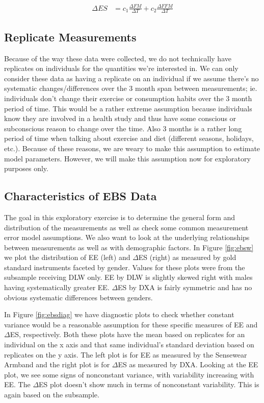 \documentclass[11pt]{article}\usepackage[]{graphicx}\usepackage[]{color}
\begin{document}
\begin{align}
  \label{escalc}
  \Delta ES &= c_1 \frac{\Delta FM}{\Delta T} + c_2 \frac{\Delta FFM}{\Delta T}
\end{align}

\subsection{Replicate Measurements}

Because of the way these data were collected, we do not technically have replicates on individuals for the quantities we're interested in. We can only consider these data as having a replicate on an individual if we assume there's no systematic changes/differences over the 3 month span between measurements; ie. individuals don't change their exercise or consumption habits over the 3 month period of time. This would be a rather extreme assumption because individuals know they are involved in a health study and thus have some conscious or subconscious reason to change over the time. Also 3 months is a rather long period of time when talking about exercise and diet (different seasons, holidays, etc.). Because of these reasons, we are weary to make this assumption to estimate model parameters. However, we will make this assumption now for exploratory purposes only. 

\subsection{Characteristics of EBS Data}

The goal in this exploratory exercise is to determine the general form and distribution of the measurements as well as check some common measurement error model assumptions. We also want to look at the underlying relationships between measurements as well as with demographic factors. In Figure \ref{fig:ebsw} we  plot the distribution of EE (left) and $\Delta$ES (right) as measured by gold standard instruments faceted by gender. Values for these plots were from the subsample receiving DLW only. EE by DLW is slightly skewed right with males having systematically greater EE. $\Delta$ES by DXA is fairly symmetric and has no obvious systematic differences between genders. 

In Figure \ref{fig:ebsdiag} we have diagnostic plots to check whether constant variance would be a reasonable assumption for these specific measures of EE and $\Delta$ES, respectively. Both these plots have the mean based on replicates for an individual on the x axis and that same individual's standard deviation based on replicates on the y axis. The left plot is for EE as measured by the Sensewear Armband and the right plot is for $\Delta$ES as measured by DXA. Looking at the EE plot, we see some signs of nonconstant variance, with variability increasing with EE. The $\Delta$ES plot doesn't show much in terms of nonconstant variability. This is again based on the subsample.
\end{document}
